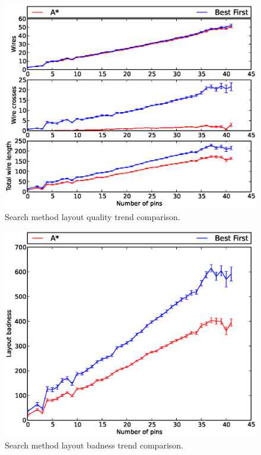 \begin{figure}[H]
\begin{center}
\includegraphics[width=\textwidth]{Images/search_quality_trend_comparison.eps}
\caption[Search method layout quality trend comparison]{Search method layout
quality trend comparison.}
\label{fig:search_quality_trend}
\end{center}
\end{figure}

\begin{figure}[H]
\begin{center}
\includegraphics[width=\textwidth]{Images/search_badness_trend_comparison.eps}
\caption[Search method layout badness trend comparison]{Search method layout
badness trend comparison.}
\label{fig:search_badness_trend}
\end{center}
\end{figure}

